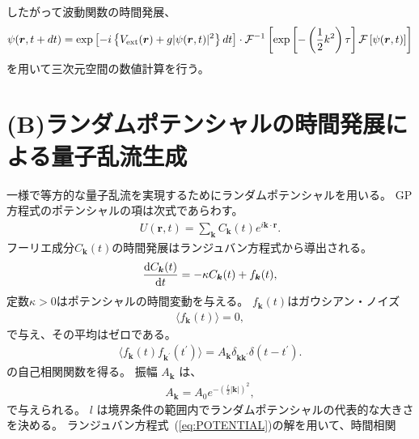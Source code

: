 \documentclass[12pt,a4paper]{jbook}
\def\Vec#1{\mbox{\boldmath $#1$}}			%
\begin{document}
            したがって波動関数の時間発展、
            \begin{eqnarray}
                \psi (\Vec{r},t+dt) = \exp \left[
                        -i \left \{
                                V_{\rm{ext}} (\Vec{r}) + g|\psi(\Vec{r},t)|^2
                            \right \} dt
                    \right]
                    \cdot
                    {\cal F}^{-1} \left[
                        \exp \left[
                            -\left(\frac{1}{2} k^2 \right) \tau
                        \right]
                        {\cal F} \left[ \psi(\Vec{r}, t) \right]
                    \right]
            \end{eqnarray}
            を用いて三次元空間の数値計算を行う。


		\section{(B)ランダムポテンシャルの時間発展による量子乱流生成}
			\label{s:random}
			一様で等方的な量子乱流を実現するためにランダムポテンシャルを用いる。
			GP方程式のポテンシャルの項は次式であらわす。
			\begin{eqnarray}
				\label{eq:POTENTIAL}
				U( {\bm r}, t) = \sum_{\bm k} C_{{\bm k}} (t) e^{i {\bm k} \cdot {\bm r}}.
			\end{eqnarray}
			フーリエ成分$C_{\bm{k}}(t)$の時間発展はランジュバン方程式から導出される。
			\begin{eqnarray}
				\label{eq:LANGEVIN}
				\frac{{\rm d} C_{\bm k}( t)}{{\rm d}t} = -\kappa C_{\bm k}(t) + f_{\bm k}(t),
			\end{eqnarray}
            定数$\kappa > 0$はポテンシャルの時間変動を与える。
            $f_{\bm k}(t)$はガウシアン・ノイズ
			\begin{eqnarray}
				\langle f_{\bm k}(t) \rangle = 0,
			\end{eqnarray}
            で与え、その平均はゼロである。
			\begin{eqnarray}
				\langle f_{\bm k}(t) f_{{\bm k}^\prime}(t^\prime)\rangle =
				A_{\bm k}\delta_{{\bm k}{\bm k}^\prime}\delta(t-t^\prime).
			\end{eqnarray}
            の自己相関関数を得る。
			振幅 $A_{\bm k}$ は、
			\begin{eqnarray}
				\label{eq:RANDOM}
				A_{\bm k} = A_0 e^{-\left(\frac{l}{2}|\bm{k}|\right)^2},
			\end{eqnarray}
			で与えられる。
			$l$ は境界条件の範囲内でランダムポテンシャルの代表的な大きさを決める。
			ランジュバン方程式~(\ref{eq:POTENTIAL})の解を用いて、時間相関
\end{document}
